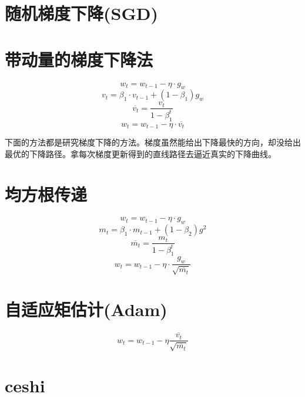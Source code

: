 \documentclass[12pt, a4paper, oneside]{ctexart}
\begin{document}
\section{随机梯度下降(SGD)}
\section{带动量的梯度下降法}
$$w_t=w_{t-1}-\eta \cdot g_w$$
$$v_t=\beta_1 \cdot v_{t-1}+(1-\beta_1)g_w$$
$$\overline{v_t}=\frac{v_t}{1-\beta_1^t}$$
$$w_t=w_{t-1}-\eta \cdot \overline{v_t}$$
\par
下面的方法都是研究梯度下降的方法。梯度虽然能给出下降最快的方向，却没给出最优的下降路径。拿每次梯度更新得到的直线路径去逼近真实的下降曲线。
\section{均方根传递}
$$w_t=w_{t-1}-\eta \cdot g_w$$
$$m_t=\beta_1 \cdot m_{t-1}+(1-\beta_2)g^2$$
$$\overline{m_t}=\frac{m_t}{1-\beta_1^t}$$
$$w_t=w_{t-1}-\eta \cdot \frac{g_w}{\sqrt{\overline{m_t}}}$$
\section{自适应矩估计(Adam)}

$$w_t=w_{t-1}-\eta \frac{\overline{v_t}}{\sqrt{\overline{m_t}}}$$

\section{ceshi}
\end{document}
